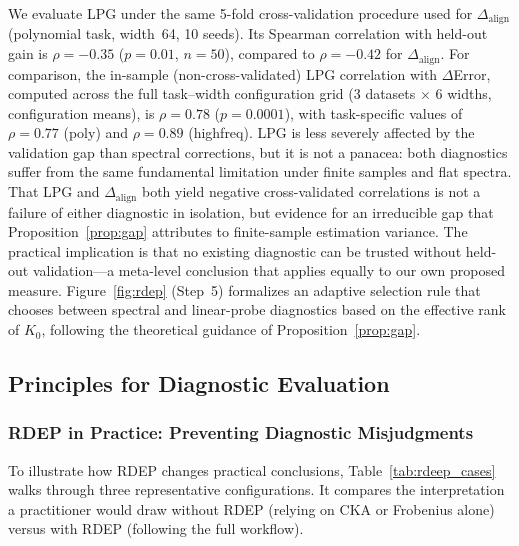 \documentclass[10pt]{article}
\begin{document}
We evaluate LPG under the same 5-fold cross-validation procedure used for $\Delta_{\text{align}}$ (polynomial task, width~64, 10 seeds). Its Spearman correlation with held-out gain is $\rho=-0.35$ ($p=0.01$, $n=50$), compared to $\rho=-0.42$ for $\Delta_{\text{align}}$. For comparison, the in-sample (non-cross-validated) LPG correlation with $\Delta$Error, computed across the full task--width configuration grid (3 datasets $\times$ 6 widths, configuration means), is $\rho=0.78$ ($p=0.0001$), with task-specific values of $\rho=0.77$ (poly) and $\rho=0.89$ (highfreq). LPG is less severely affected by the validation gap than spectral corrections, but it is not a panacea: both diagnostics suffer from the same fundamental limitation under finite samples and flat spectra. That LPG and $\Delta_{\text{align}}$ both yield negative cross-validated correlations is not a failure of either diagnostic in isolation, but evidence for an irreducible gap that Proposition~\ref{prop:gap} attributes to finite-sample estimation variance. The practical implication is that no existing diagnostic can be trusted without held-out validation---a meta-level conclusion that applies equally to our own proposed measure. Figure~\ref{fig:rdep} (Step~5) formalizes an adaptive selection rule that chooses between spectral and linear-probe diagnostics based on the effective rank of $K_0$, following the theoretical guidance of Proposition~\ref{prop:gap}.

\vspace{4pt}
\subsection{Principles for Diagnostic Evaluation}\label{sec:principles}
\vspace{2pt}

\subsubsection{RDEP in Practice: Preventing Diagnostic Misjudgments}

To illustrate how RDEP changes practical conclusions, Table~\ref{tab:rdeep_cases} walks through three representative configurations. It compares the interpretation a practitioner would draw without RDEP (relying on CKA or Frobenius alone) versus with RDEP (following the full workflow).
\end{document}
